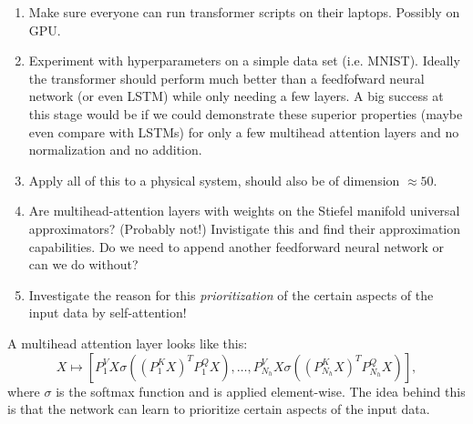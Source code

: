 \documentclass{article}
\begin{document}
\begin{enumerate}
    \item Make sure everyone can run transformer scripts on their laptops. Possibly on GPU. 
    
    \item Experiment with hyperparameters on a simple data set (i.e. MNIST). Ideally the transformer should perform much better than a feedfofward neural network (or even LSTM) while only needing a few layers. 
        A big success at this stage would be if we could demonstrate these superior properties (maybe even compare with LSTMs) for only a few multihead attention layers and no normalization and no addition. 
    
        \item Apply all of this to a physical system, should also be of dimension $\approx50$.

    \item Are multihead-attention layers with weights on the Stiefel manifold universal approximators? (Probably not!) Invistigate this and find their approximation capabilities. Do we need to append another feedforward neural network or can we do without?

    \item Investigate the reason for this \textit{prioritization} of the certain aspects of the input data by self-attention!
\end{enumerate}

A multihead attention layer looks like this: 
\begin{equation}
    X \mapsto [P^V_1X\sigma((P^K_1X)^TP^Q_1X), \ldots, P^V_{N_h}X\sigma((P^K_{N_h}X)^TP^Q_{N_h}X)],
\end{equation}
where $\sigma$ is the softmax function and is applied element-wise. The idea behind this is that the network can learn to prioritize certain aspects of the input data.
\end{document}
